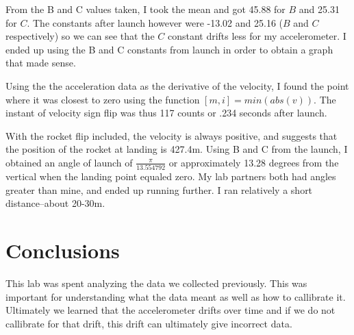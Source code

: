 \documentclass[a4paper,11pt]{article}
\begin{document}
{From the B and C values taken, I took the mean and got 45.88 for $B$ and 25.31 for $C$. The constants after launch however were -13.02 and 25.16 ($B$ and $C$ respectively) so we can see that the $C$ constant drifts less for my accelerometer. I ended up using the B and C constants from launch in order to obtain a graph that made sense.}

{Using the the acceleration data as the derivative of the velocity, I found the point where it was closest to zero using the function $[m,i] = min(abs(v))$. The instant of velocity sign flip was thus 117 counts or .234 seconds after launch. }

{With the rocket flip included, the velocity is always positive, and suggests that the position of the rocket at landing is 427.4m. Using B and C from the launch, I obtained an angle of launch of $\frac{\pi}{13.554792}$ or approximately 13.28 degrees from the vertical when the landing point equaled zero.}
{My lab partners both had angles greater than mine, and ended up running further. I ran relatively a short distance–about 20-30m.}
\section{Conclusions}
{\quad This lab was spent analyzing the data we collected previously. This was important for understanding what the data meant as well as how to callibrate it. Ultimately we learned that the accelerometer drifts over time and if we do not callibrate for that drift, this drift can ultimately give incorrect data. }
\end{document}
